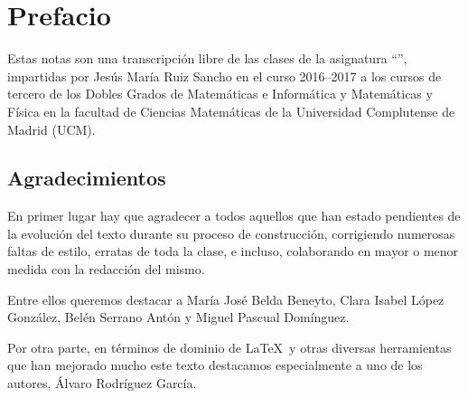 \section*{Prefacio}
\label{pref}
Estas notas son una transcripción libre de las clases de la asignatura ``'', impartidas por Jesús María Ruiz Sancho en el curso 2016--2017 a los cursos de tercero de los Dobles Grados de Matemáticas e Informática y Matemáticas y Física en la facultad de Ciencias Matemáticas de la Universidad Complutense de Madrid (UCM).

\subsection*{Agradecimientos}
En primer lugar hay que agradecer a todos aquellos que han estado pendientes de la evolución del texto durante su proceso de construcción, corrigiendo numerosas faltas de estilo, erratas de toda la clase, e incluso, colaborando en mayor o menor medida con la redacción del mismo.

Entre ellos queremos destacar a María José Belda Beneyto, Clara Isabel López González, Belén Serrano Antón y Miguel Pascual Domínguez.

Por otra parte, en términos de dominio de \LaTeX\ y otras diversas herramientas que han mejorado mucho este texto destacamos especialmente a uno de los autores, Álvaro Rodríguez García.